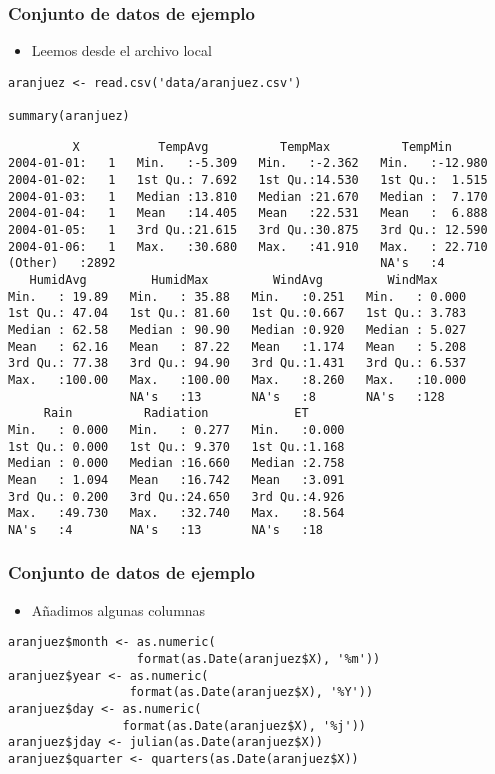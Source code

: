 \documentclass[xcolor={usenames,svgnames,dvipsnames}]{beamer}
\begin{document}
\begin{frame}[fragile]
\frametitle{Conjunto de datos de ejemplo}
\label{sec-1-1-2}

\begin{itemize}
\item Leemos desde el archivo local
\end{itemize}

\lstset{language=R}
\begin{lstlisting}
aranjuez <- read.csv('data/aranjuez.csv')

summary(aranjuez)
\end{lstlisting}


\begin{verbatim}
         X           TempAvg          TempMax          TempMin       
2004-01-01:   1   Min.   :-5.309   Min.   :-2.362   Min.   :-12.980  
2004-01-02:   1   1st Qu.: 7.692   1st Qu.:14.530   1st Qu.:  1.515  
2004-01-03:   1   Median :13.810   Median :21.670   Median :  7.170  
2004-01-04:   1   Mean   :14.405   Mean   :22.531   Mean   :  6.888  
2004-01-05:   1   3rd Qu.:21.615   3rd Qu.:30.875   3rd Qu.: 12.590  
2004-01-06:   1   Max.   :30.680   Max.   :41.910   Max.   : 22.710  
(Other)   :2892                                     NA's   :4        
   HumidAvg         HumidMax         WindAvg         WindMax      
Min.   : 19.89   Min.   : 35.88   Min.   :0.251   Min.   : 0.000  
1st Qu.: 47.04   1st Qu.: 81.60   1st Qu.:0.667   1st Qu.: 3.783  
Median : 62.58   Median : 90.90   Median :0.920   Median : 5.027  
Mean   : 62.16   Mean   : 87.22   Mean   :1.174   Mean   : 5.208  
3rd Qu.: 77.38   3rd Qu.: 94.90   3rd Qu.:1.431   3rd Qu.: 6.537  
Max.   :100.00   Max.   :100.00   Max.   :8.260   Max.   :10.000  
                 NA's   :13       NA's   :8       NA's   :128     
     Rain          Radiation            ET       
Min.   : 0.000   Min.   : 0.277   Min.   :0.000  
1st Qu.: 0.000   1st Qu.: 9.370   1st Qu.:1.168  
Median : 0.000   Median :16.660   Median :2.758  
Mean   : 1.094   Mean   :16.742   Mean   :3.091  
3rd Qu.: 0.200   3rd Qu.:24.650   3rd Qu.:4.926  
Max.   :49.730   Max.   :32.740   Max.   :8.564  
NA's   :4        NA's   :13       NA's   :18
\end{verbatim}
\end{frame}
\begin{frame}[fragile]
\frametitle{Conjunto de datos de ejemplo}
\label{sec-1-1-3}

\begin{itemize}
\item Añadimos algunas columnas
\end{itemize}

\lstset{language=R}
\begin{lstlisting}
aranjuez$month <- as.numeric(
                  format(as.Date(aranjuez$X), '%m'))
aranjuez$year <- as.numeric(
                 format(as.Date(aranjuez$X), '%Y'))
aranjuez$day <- as.numeric(
                format(as.Date(aranjuez$X), '%j'))
aranjuez$jday <- julian(as.Date(aranjuez$X))
aranjuez$quarter <- quarters(as.Date(aranjuez$X))
\end{lstlisting}
\end{frame}
\end{document}
